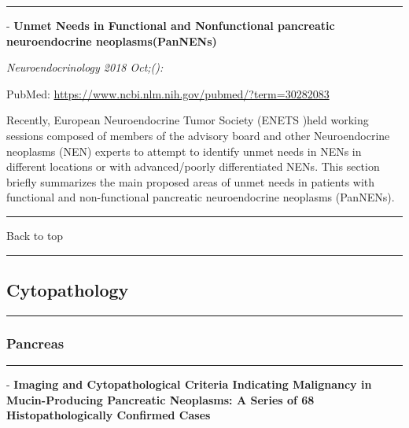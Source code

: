 \documentclass[]{article}
\begin{document}
{}

\begin{center}\rule{0.5\linewidth}{\linethickness}\end{center}

 - \textbf{Unmet Needs in Functional and Nonfunctional pancreatic
neuroendocrine neoplasms(PanNENs)}

\emph{Neuroendocrinology 2018 Oct;():}

PubMed: \url{https://www.ncbi.nlm.nih.gov/pubmed/?term=30282083}

Recently, European Neuroendocrine Tumor Society (ENETS )held working
sessions composed of members of the advisory board and other
Neuroendocrine neoplasms (NEN) experts to attempt to identify unmet
needs in NENs in different locations or with advanced/poorly
differentiated NENs. This section briefly summarizes the main proposed
areas of unmet needs in patients with functional and non-functional
pancreatic neuroendocrine neoplasms (PanNENs).

{}

{}

\begin{center}\rule{0.5\linewidth}{\linethickness}\end{center}

Back to top

\begin{center}\rule{0.5\linewidth}{\linethickness}\end{center}

\pagebreak

\hypertarget{cytopathology}{%
\subsection{Cytopathology}\label{cytopathology}}

\begin{center}\rule{0.5\linewidth}{\linethickness}\end{center}

\hypertarget{pancreas-1}{%
\subsubsection{Pancreas}\label{pancreas-1}}

\begin{center}\rule{0.5\linewidth}{\linethickness}\end{center}

 - \textbf{Imaging and Cytopathological Criteria Indicating Malignancy
in Mucin-Producing Pancreatic Neoplasms: A Series of 68
Histopathologically Confirmed Cases}
\end{document}
